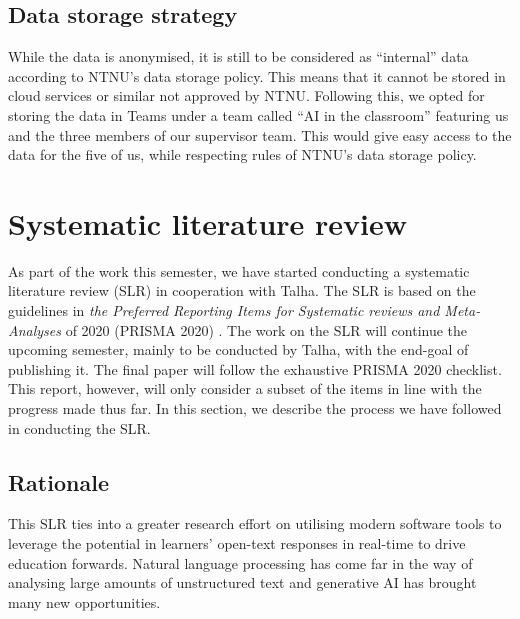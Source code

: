 \subsection{Data storage strategy}
While the data is anonymised, it is still to be considered as ``internal'' data according to NTNU's data storage policy. This means that it cannot be stored in cloud services or similar not approved by NTNU. Following this, we opted for storing the data in Teams under a team called ``AI in the classroom'' featuring us and the three members of our supervisor team. This would give easy access to the data for the five of us, while respecting rules of NTNU's data storage policy.

\section{Systematic literature review}
As part of the work this semester, we have started conducting a systematic literature review (SLR) in cooperation with Talha. The SLR is based on the guidelines in \textit{the Preferred Reporting Items for Systematic reviews and Meta-Analyses} of 2020 (PRISMA 2020) \cite{prisma2020}. The work on the SLR will continue the upcoming semester, mainly to be conducted by Talha, with the end-goal of publishing it. The final paper will follow the exhaustive PRISMA 2020 checklist. This report, however, will only consider a subset of the items in line with the progress made thus far. In this section, we describe the process we have followed in conducting the SLR.

\subsection{Rationale}
This SLR ties into a greater research effort on utilising modern software tools to leverage the potential in learners' open-text responses in real-time to drive education forwards. Natural language processing has come far in the way of analysing large amounts of unstructured text and generative AI has brought many new opportunities.

